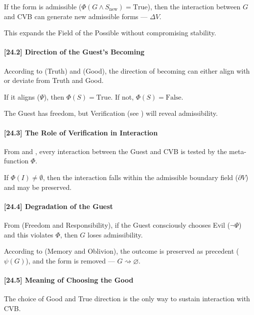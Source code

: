 \documentclass[12pt]{article}
\begin{document}
If the form is admissible ($\Phi(G \land S_{\text{new}}) = \text{True}$), then the interaction between $G$ and CVB can generate new admissible forms — $\Delta V$.

This expands the Field of the Possible without compromising stability.

\paragraph{[24.2] Direction of the Guest’s Becoming}

According to \text{[11.2.1]} (Truth) and \text{[11.3.1]} (Good), the direction of becoming can either align with or deviate from Truth and Good.

If it aligns ($\Psi$), then $\Phi(S) = \text{True}$. If not, $\Phi(S) = \text{False}$.

The Guest has freedom, but Verification (see \text{[20]}) will reveal admissibility.

\paragraph{[24.3] The Role of Verification in Interaction}

From \text{[20]} and \text{[21]}, every interaction between the Guest and CVB is tested by the meta-function $\Phi$.

If $\Phi(I) \neq \emptyset$, then the interaction falls within the admissible boundary field ($\partial V$) and may be preserved.

\paragraph{[24.4] Degradation of the Guest}

From \text{[22]} (Freedom and Responsibility), if the Guest consciously chooses Evil ($\neg \Psi$) and this violates $\Phi$, then $G$ loses admissibility.

According to \text{[16]} (Memory and Oblivion), the outcome is preserved as precedent ($\psi(G)$), and the form is removed — $G \rightsquigarrow \varnothing$.

\paragraph{[24.5] Meaning of Choosing the Good}

The choice of Good and True direction is the only way to sustain interaction with CVB.
\end{document}
